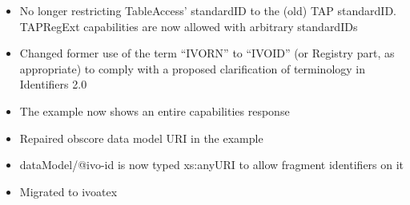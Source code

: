 \documentclass{ivoa}
\begin{document}
\begin{itemize}

\item No longer restricting TableAccess' standardID to the (old)
TAP standardID.  TAPRegExt capabilities are now allowed with arbitrary
standardIDs
\item Changed former use of the term ``IVORN''  to ``IVOID'' (or
Registry part, as appropriate) to comply with a proposed clarification of
terminology in Identifiers 2.0
\item The example now shows an entire capabilities response
\item Repaired obscore data model URI in the example
\item dataModel/@ivo-id is now typed xs:anyURI
to allow fragment identifiers on it
\item Migrated to ivoatex
\end{itemize}


\end{document}
